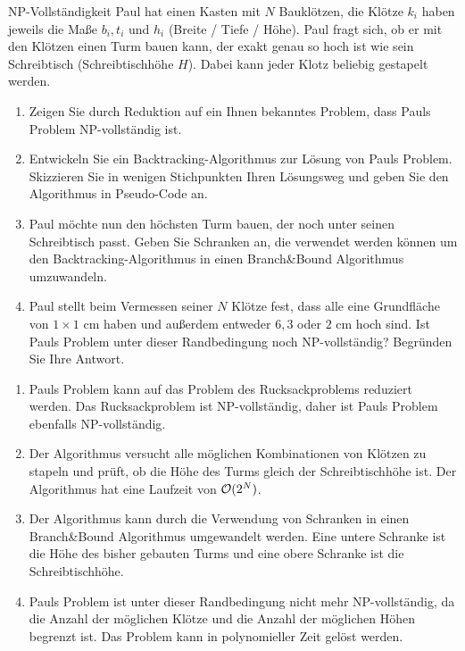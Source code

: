 \documentclass{article}
\begin{document}
\begin{exercise}{NP-Vollständigkeit}
  Paul hat einen Kasten mit $N$ Bauklötzen, die Klötze $k_i$ haben jeweils die Maße $b_i, t_i$ und $h_i$ (Breite / Tiefe / Höhe). Paul fragt sich, ob er mit den Klötzen einen Turm bauen kann, der exakt genau so hoch ist wie sein Schreibtisch (Schreibtischhöhe $H$). Dabei kann jeder Klotz beliebig gestapelt werden.
  \begin{enumerate}
    \item Zeigen Sie durch Reduktion auf ein Ihnen bekanntes Problem, dass Pauls Problem NP-vollständig ist.
    \item Entwickeln Sie ein Backtracking-Algorithmus zur Lösung von Pauls Problem. Skizzieren Sie in wenigen Stichpunkten Ihren Lösungsweg und geben Sie den Algorithmus in Pseudo-Code an.
    \item Paul möchte nun den höchsten Turm bauen, der noch unter seinen Schreibtisch passt. Geben Sie Schranken an, die verwendet werden können um den Backtracking-Algorithmus in einen Branch\&Bound Algorithmus umzuwandeln.
    \item Paul stellt beim Vermessen seiner $N$ Klötze fest, dass alle eine Grundfläche von $1 \times 1$ cm haben und außerdem entweder $6, 3$ oder $2$ cm hoch sind. Ist Pauls Problem unter dieser Randbedingung noch NP-vollständig? Begründen Sie Ihre Antwort.
  \end{enumerate}

  \begin{solution}
    \begin{enumerate}
      \item Pauls Problem kann auf das Problem des Rucksackproblems reduziert werden. Das Rucksackproblem ist NP-vollständig, daher ist Pauls Problem ebenfalls NP-vollständig.
      \item Der Algorithmus versucht alle möglichen Kombinationen von Klötzen zu stapeln und prüft, ob die Höhe des Turms gleich der Schreibtischhöhe ist. Der Algorithmus hat eine Laufzeit von $\mathcal{O}(2^N)$.
      \item Der Algorithmus kann durch die Verwendung von Schranken in einen Branch\&Bound Algorithmus umgewandelt werden. Eine untere Schranke ist die Höhe des bisher gebauten Turms und eine obere Schranke ist die Schreibtischhöhe.
      \item Pauls Problem ist unter dieser Randbedingung nicht mehr NP-vollständig, da die Anzahl der möglichen Klötze und die Anzahl der möglichen Höhen begrenzt ist. Das Problem kann in polynomieller Zeit gelöst werden.
    \end{enumerate}
  \end{solution}
\end{exercise}
\end{document}

